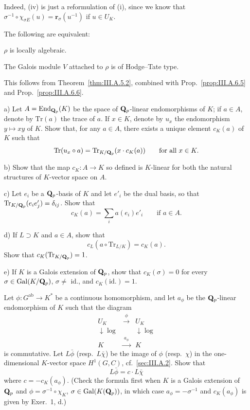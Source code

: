 Indeed, (iv) is just a reformulation of (i), since we know that
$\sigma^{-1}\circ\chi_{\sigma E}(u)=\mathbf{r}_\sigma(u^{-1})$ if
$u\in U_K$.

\begin{corollary}
The following are equivalent:
\begin{alist}
\item $\rho$ is locally algebraic.
\item The Galois module $V$ attached to $\rho$ is of Hodge--Tate type.
\end{alist}
\end{corollary}

This follows from Theorem~\ref{thm:III.A.5.2}, combined with
Prop.~\ref{prop:III.A.6.5} and Prop.~\ref{prop:III.A.6.6}.

\begin{exercises}

\begin{nlist}

\item a) Let $A=\mathrm{End}_{\mathbf{Q}_p}(K)$ be the space of $\mathbf{Q}_p$-linear
endomorphisms of $K$; if $a\in A$, denote by $\mathrm{Tr}(a)$ the trace of
$a$.  If $x\in K$, denote by $u_x$ the endomorphism $y\mapsto xy$ of
$K$.  Show that, for any $a\in A$, there exists a unique element
$c_K(a)$ of $K$ such that
\[
\mathrm{Tr}(u_x\circ a)=\mathrm{Tr}_{K/\mathbf{Q}_p}(x\cdot c_K(a))
\qquad\text{for all } x\in K.
\]

b) Show that the map $c_K\colon A\to K$ so defined is $K$-linear for
both the natural structures of $K$-vector space on $A$.

c) Let $e_i$ be a $\mathbf{Q}_p$-basis of $K$ and let $e'_i$ be the dual
basis, so that $\mathrm{Tr}_{K/\mathbf{Q}_p}(e_i e'_j)=\delta_{ij}$.  Show that
\[
c_K(a)=\sum_i a(e_i)e'_i \qquad\text{if } a\in A.
\]

d) If $L\supset K$ and $a\in A$, show that
\[
c_L(a\circ\mathrm{Tr}_{L/K})=c_K(a).
\]
Show that $c_K(\mathrm{Tr}_{K/\mathbf{Q}_p})=1$.

e) If $K$ is a Galois extension of $\mathbf{Q}_p$, show that $c_K(\sigma)=0$
for every $\sigma\in\mathrm{Gal}(K/\mathbf{Q}_p)$, $\sigma\neq$ id., and
$c_K(\mathrm{id.})=1$.

\item Let $\phi\colon G^{\mathrm{ab}}\to K^*$ be a continuous
homomorphism, and let $a_\phi$ be the $\mathbf{Q}_p$-linear endomorphism of
$K$ such that the diagram
\[
\begin{array}{ccc}
U_K & \xrightarrow{\ \phi\ } & U_K\\[0.3ex]
\downarrow\log && \downarrow\log\\[0.3ex]
K & \xrightarrow{\ a_\phi\ } & K
\end{array}
\]
is commutative.  Let $L\bar\phi$ (resp.\ $L\bar\chi$) be the image of
$\phi$ (resp.\ $\chi$) in the one-dimensional $K$-vector space
$H^1(G,C)$, cf.~\ref{sec:III.A.2}.  Show that
\[
L\bar\phi=c\cdot L\bar\chi
\]
where $c=-c_K(a_\phi)$.  (Check the formula first when $K$ is a Galois
extension of $\mathbf{Q}_p$ and $\phi=\sigma^{-1}\circ\chi_K$,
$\sigma\in\mathrm{Gal}(K(\mathbf{Q}_p))$, in which case $a_\phi=-\sigma^{-1}$ and
$c_K(a_\phi)$ is given by Exer.~1, d.)


\end{nlist}
\end{exercises}
